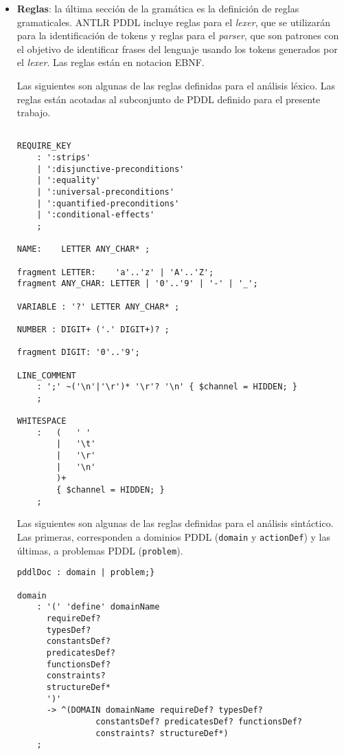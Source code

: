 \begin{itemize}
\item {\bf Reglas}: la \'ultima secci\'on de la gram\'atica
es la definici\'on de reglas gramaticales. ANTLR PDDL
incluye reglas para el \emph{lexer}, que se utilizar\'an
para la identificaci\'on de tokens y reglas para
el \emph{parser}, que son patrones con el objetivo de
identificar frases del lenguaje usando los tokens
generados por el \emph{lexer}. Las reglas est\'an en
notacion EBNF.

\begin{ejemplo}%

Las siguientes son algunas de las reglas definidas 
para el an\'alisis l\'exico. Las reglas est\'an acotadas
al subconjunto de PDDL definido para el presente trabajo.

 \begin{verbatim}

REQUIRE_KEY
    : ':strips'
    | ':disjunctive-preconditions'
    | ':equality'
    | ':universal-preconditions'
    | ':quantified-preconditions'
    | ':conditional-effects'
    ;

NAME:    LETTER ANY_CHAR* ;

fragment LETTER:	'a'..'z' | 'A'..'Z';
fragment ANY_CHAR: LETTER | '0'..'9' | '-' | '_';

VARIABLE : '?' LETTER ANY_CHAR* ;

NUMBER : DIGIT+ ('.' DIGIT+)? ;

fragment DIGIT: '0'..'9';

LINE_COMMENT
    : ';' ~('\n'|'\r')* '\r'? '\n' { $channel = HIDDEN; }
    ;

WHITESPACE
    :   (   ' '
        |   '\t'
        |   '\r'
        |   '\n'
        )+
        { $channel = HIDDEN; }
    ;
 \end{verbatim}
\end{ejemplo}

\begin{ejemplo}%

Las siguientes son algunas de las reglas definidas
para el an\'alisis sint\'actico. Las primeras, corresponden
a dominios PDDL (\texttt{domain} y \texttt{actionDef}) 
y las \'ultimas, a problemas PDDL (\texttt{problem}). 

 \begin{verbatim}
pddlDoc : domain | problem;}

domain
    : '(' 'define' domainName
      requireDef?
      typesDef?
      constantsDef?
      predicatesDef?
      functionsDef?
      constraints?
      structureDef*
      ')'
      -> ^(DOMAIN domainName requireDef? typesDef?
                constantsDef? predicatesDef? functionsDef?
                constraints? structureDef*)
    ;
    

\end{verbatim}
\end{ejemplo}
\end{itemize}
